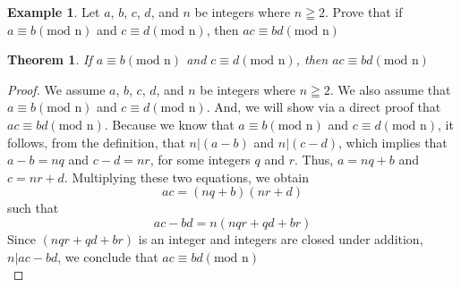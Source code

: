 \documentclass{book}
\newtheorem{theorem}{Theorem}[section]
\theoremstyle{definition}
\newtheorem{example}{Example}[definition]
\theoremstyle{remark}
\begin{document}
\begin{example}
Let $a$, $b$, $c$, $d$, and $n$ be integers where $n \geqq 2$. Prove that if $a \equiv b (\text{mod n})$ and $c \equiv d (\text{mod n})$, then $ ac \equiv bd (\text{mod n})$

\begin{tcolorbox}
	\begin{theorem}
		 If $a \equiv b (\text{mod n})$ and $c \equiv d (\text{mod n})$, then $ ac \equiv bd (\text{mod n})$
	\end{theorem}
\end{tcolorbox}

\begin{proof}
We assume $a$, $b$, $c$, $d$, and $n$ be integers where $n \geqq 2$.  We also assume that $a \equiv b (\text{mod n})$ and $c \equiv d (\text{mod n})$. And, we will show via a direct proof that $ac \equiv bd (\text{mod n})$. Because we know that $a \equiv b (\text{mod n})$ and $c \equiv d (\text{mod n})$, it follows, from the definition, that   $n | (a-b)$ and $n | (c-d)$, which implies that $a-b = nq$ and $c-d = nr$, for some integers $q$ and $r$. Thus, $a = nq + b$ and $c = nr + d$. Multiplying these two equations, we obtain \[ ac = (nq + b)(nr + d) \] such that \[ ac - bd = n(nqr + qd + br) \] 
Since $(nqr + qd + br)$ is an integer and integers are closed under addition, $n | ac - bd$, we conclude that $ac \equiv bd (\text{mod n})$ \\
\end{proof}
\end{example}
\end{document}
